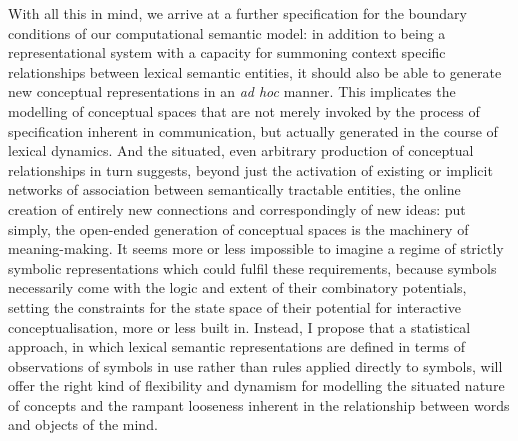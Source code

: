 With all this in mind, we arrive at a further specification for the boundary conditions of our computational semantic model: in addition to being a representational system with a capacity for summoning context specific relationships between lexical semantic entities, it should also be able to generate new conceptual representations in an \emph{ad hoc} manner.  This implicates the modelling of conceptual spaces that are not merely invoked by the process of specification inherent in communication, but actually generated in the course of lexical dynamics.  And the situated, even arbitrary production of conceptual relationships in turn suggests, beyond just the activation of existing or implicit networks of association between semantically tractable entities, the online creation of entirely new connections and correspondingly of new ideas: put simply, the open-ended generation of conceptual spaces is the machinery of meaning-making.  It seems more or less impossible to imagine a regime of strictly symbolic representations which could fulfil these requirements, because symbols necessarily come with the logic and extent of their combinatory potentials, setting the constraints for the state space of their potential for interactive conceptualisation, more or less built in.  Instead, I propose that a statistical approach, in which lexical semantic representations are defined in terms of observations of symbols in use rather than rules applied directly to symbols, will offer the right kind of flexibility and dynamism for modelling the situated nature of concepts and the rampant looseness inherent in the relationship between words and objects of the mind.


